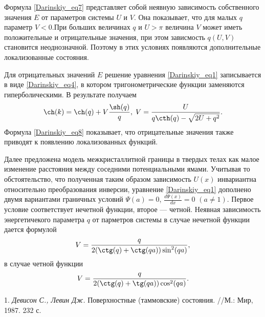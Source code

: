 \documentclass{vzmsthesis}
\begin{document}
Формула \eqref{Darinskiy_eq7}  представляет собой неявную зависимость собственного значения $E$ от параметров
системы $U$ и $V$. Она показывает, что для малых $q$ параметр $V<0$.При больших величинах $q$ и $U>\pi$ величина $V$
может иметь положительные и отрицательные значения, при этом зависмость $q(U,V)$ становится
неоднозначной. Поэтому в этих условиях появляются  дополнительные локализованные состояния.
\par Для отрицательных значений $E$ решение уравнения \eqref{Darinskiy_eq1} записывается в виде \eqref{Darinskiy_eq4}, в котором тригонометрические функции заменяются гиперболическими. 
В результате получаем
\begin{multline} \label{Darinskiy_eq8}
\ch(k)=\ch(q)+V\frac{\sh(q)}{q},\;V=\frac{U}{q\cth(q)-\sqrt{2U+q^2}}.
\end{multline}
Формула \eqref{Darinskiy_eq8} показывает, что отрицательные значения также приводят к появлению локализованных функций.
\par Далее предложена модель межкристаллитной границы в твердых телах как малое изменение расстояния между соседними потенциальными ямами. Учитывая то обстоятельство, что полученная таким образом зависимость $U(x)$
инвариантна относительно преобразования инверсии, уравнение \eqref{Darinskiy_eq1} дополнено двумя вариантами граничных условий           
$\Psi(a)=0$, $\frac{d\Psi(x)}{dx}=0$ $(a\neq1)$. Первое условие соответствует
нечетной функции, второе — четной. Неявная зависимость энергетичекого параметра $q$ от парметров системы в случае нечетной функции дается формулой
\begin{equation*}
V=\frac{q}{2(\ctg(q)+\ctg(qa))\sin^2(qa)},
\end{equation*}
в случае четной функции
\begin{equation*}
V=\frac{q}{2(\ctg(q)+\tg(qa))\cos^2(qa)}.
\end{equation*}
\litlist

1. {\it Девисон С., Левин Дж.} Поверхностные (таммовские) состояния. //М.: Мир, 1987. 232 с.
\end{document}
